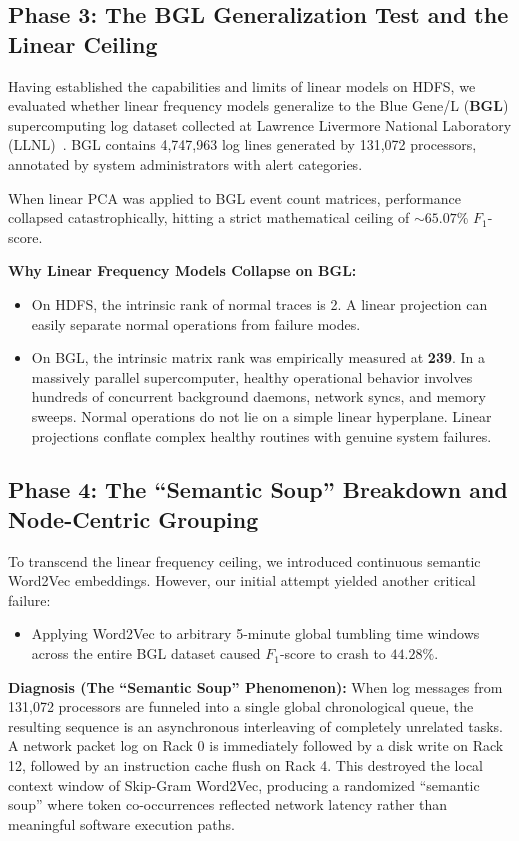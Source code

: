 \subsection{Phase 3: The BGL Generalization Test and the Linear Ceiling}
\label{subsec:bgl_linear_ceiling}
Having established the capabilities and limits of linear models on HDFS, we evaluated whether linear frequency models generalize to the Blue Gene/L (\textbf{BGL}) supercomputing log dataset collected at Lawrence Livermore National Laboratory (LLNL)~\cite{oliner2007supercomputer}. BGL contains 4,747,963 log lines generated by 131,072 processors, annotated by system administrators with alert categories. 

When linear PCA was applied to BGL event count matrices, performance collapsed catastrophically, hitting a strict mathematical ceiling of $\mathbf{\sim 65.07\%}$ $F_1$-score. 

\textbf{Why Linear Frequency Models Collapse on BGL:}
\begin{itemize}
    \item On HDFS, the intrinsic rank of normal traces is 2. A linear projection can easily separate normal operations from failure modes.
    \item On BGL, the intrinsic matrix rank was empirically measured at \textbf{239}. In a massively parallel supercomputer, healthy operational behavior involves hundreds of concurrent background daemons, network syncs, and memory sweeps. Normal operations do not lie on a simple linear hyperplane. Linear projections conflate complex healthy routines with genuine system failures.
\end{itemize}

\subsection{Phase 4: The ``Semantic Soup'' Breakdown and Node-Centric Grouping}
\label{subsec:semantic_soup}
To transcend the linear frequency ceiling, we introduced continuous semantic Word2Vec embeddings. However, our initial attempt yielded another critical failure:
\begin{itemize}
    \item Applying Word2Vec to arbitrary 5-minute global tumbling time windows across the entire BGL dataset caused $F_1$-score to crash to $\mathbf{44.28\%}$.
\end{itemize}

\textbf{Diagnosis (The ``Semantic Soup'' Phenomenon):} When log messages from 131,072 processors are funneled into a single global chronological queue, the resulting sequence is an asynchronous interleaving of completely unrelated tasks. A network packet log on Rack 0 is immediately followed by a disk write on Rack 12, followed by an instruction cache flush on Rack 4. This destroyed the local context window of Skip-Gram Word2Vec, producing a randomized ``semantic soup'' where token co-occurrences reflected network latency rather than meaningful software execution paths.

